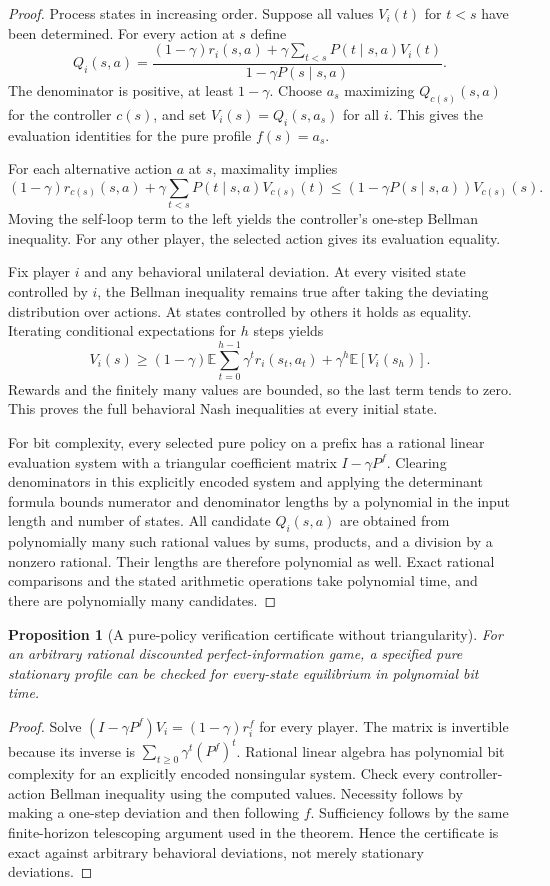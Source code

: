 \documentclass[11pt]{article}
\newtheorem{proposition}{Proposition}
\theoremstyle{definition}
\theoremstyle{remark}
\begin{document}
\begin{proof}
Process states in increasing order. Suppose all values $V_i(t)$ for $t<s$ have been determined. For every action at $s$ define
\[
 Q_i(s,a)=\frac{(1-\gamma)r_i(s,a)+\gamma\sum_{t<s}P(t\mid s,a)V_i(t)}
 {1-\gamma P(s\mid s,a)}.
\]
The denominator is positive, at least $1-\gamma$. Choose $a_s$ maximizing $Q_{c(s)}(s,a)$ for the controller $c(s)$, and set $V_i(s)=Q_i(s,a_s)$ for all $i$. This gives the evaluation identities for the pure profile $f(s)=a_s$.

For each alternative action $a$ at $s$, maximality implies
\[
 (1-\gamma)r_{c(s)}(s,a)+\gamma\sum_{t<s}P(t\mid s,a)V_{c(s)}(t)
 \leq(1-\gamma P(s\mid s,a))V_{c(s)}(s).
\]
Moving the self-loop term to the left yields the controller's one-step Bellman inequality. For any other player, the selected action gives its evaluation equality.

Fix player $i$ and any behavioral unilateral deviation. At every visited state controlled by $i$, the Bellman inequality remains true after taking the deviating distribution over actions. At states controlled by others it holds as equality. Iterating conditional expectations for $h$ steps yields
\[
 V_i(s)\geq(1-\gamma)\mathbb E\sum_{t=0}^{h-1}\gamma^t r_i(s_t,a_t)
       +\gamma^h\mathbb E[V_i(s_h)].
\]
Rewards and the finitely many values are bounded, so the last term tends to zero. This proves the full behavioral Nash inequalities at every initial state.

For bit complexity, every selected pure policy on a prefix has a rational linear evaluation system with a triangular coefficient matrix $I-\gamma P^f$. Clearing denominators in this explicitly encoded system and applying the determinant formula bounds numerator and denominator lengths by a polynomial in the input length and number of states. All candidate $Q_i(s,a)$ are obtained from polynomially many such rational values by sums, products, and a division by a nonzero rational. Their lengths are therefore polynomial as well. Exact rational comparisons and the stated arithmetic operations take polynomial time, and there are polynomially many candidates.
\end{proof}

\begin{proposition}[A pure-policy verification certificate without triangularity]
For an arbitrary rational discounted perfect-information game, a specified pure stationary profile can be checked for every-state equilibrium in polynomial bit time.
\end{proposition}
\begin{proof}
Solve $(I-\gamma P^f)V_i=(1-\gamma)r_i^f$ for every player. The matrix is invertible because its inverse is $\sum_{t\geq0}\gamma^t(P^f)^t$. Rational linear algebra has polynomial bit complexity for an explicitly encoded nonsingular system. Check every controller-action Bellman inequality using the computed values. Necessity follows by making a one-step deviation and then following $f$. Sufficiency follows by the same finite-horizon telescoping argument used in the theorem. Hence the certificate is exact against arbitrary behavioral deviations, not merely stationary deviations.
\end{proof}
\end{document}
